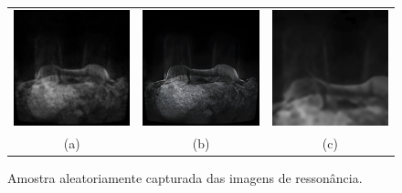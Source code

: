 \begin{figure}[H]
    \centering
    \caption{Amostra aleatoriamente capturada das imagens de ressonância.}
    \begin{tabular}{c c c}
        \includegraphics[width=4.2cm]{fig/samples/mri/mri_original.png} 
            & \includegraphics[width=4.2cm]{fig/samples/mri/mri_non_specific_training.png} 
            & \includegraphics[width=4.2cm]{fig/samples/mri/mri_specific_training.png} \\
        (a) & (b) & (c)
    \end{tabular}
    \label{fig:img-results:fig1}
\end{figure}


